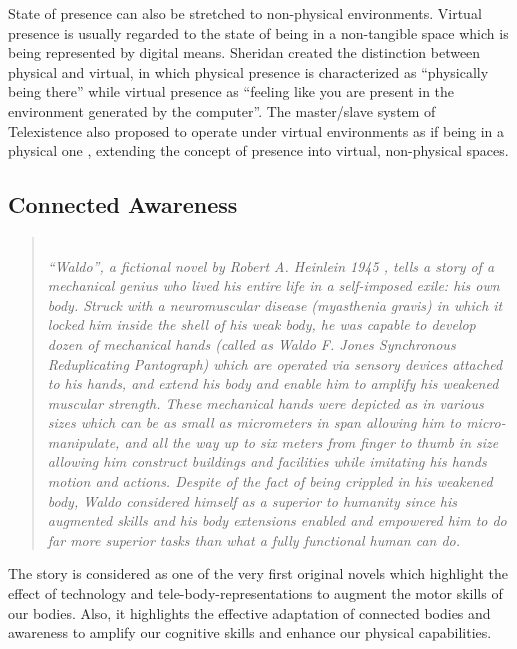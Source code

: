 State of presence can also be stretched to non-physical environments. Virtual presence is usually regarded to the state of being in a non-tangible space which is being represented by digital means. Sheridan \cite{sheridan1992musings} created the distinction between physical and virtual, in which physical presence is characterized as ``physically being there'' while virtual presence as ``feeling like you are present in the environment generated by the computer''. The master/slave system of Telexistence also proposed to operate under virtual environments as if being in a physical one \cite{tachi1991tele}, extending the concept of presence into virtual, non-physical spaces.

\pagebreak
\subsection{Connected Awareness}


\begin{shaded}
\begin{quote}
\textit{
\\
``Waldo'', a fictional novel by Robert A. Heinlein 1945 \cite{heinlein1942waldo}, tells a story of a mechanical genius who lived his entire life in a self-imposed exile: his own body. Struck with a neuromuscular disease (myasthenia gravis) in which it locked him inside the shell of his weak body, he was capable to develop dozen of mechanical hands (called as Waldo F. Jones Synchronous Reduplicating Pantograph) which are operated via sensory devices attached to his hands, and extend his body and enable him to amplify his weakened muscular strength. These mechanical hands were depicted as in various sizes which can be as small as micrometers in span allowing him to micro-manipulate, and all the way up to six meters from finger to thumb in size allowing him construct buildings and facilities while imitating his hands motion and actions. Despite of the fact of being crippled in his weakened body, Waldo considered himself as a superior to humanity since his augmented skills and his body extensions enabled and empowered him to do far more superior tasks than what a fully functional human can do. 
}


\end{quote}
\end{shaded}

The story is considered as one of the very first original novels which highlight the effect of technology and tele-body-representations to augment the motor skills of our bodies. Also, it highlights the effective adaptation of connected bodies and awareness to amplify our cognitive skills and enhance our physical capabilities. 

